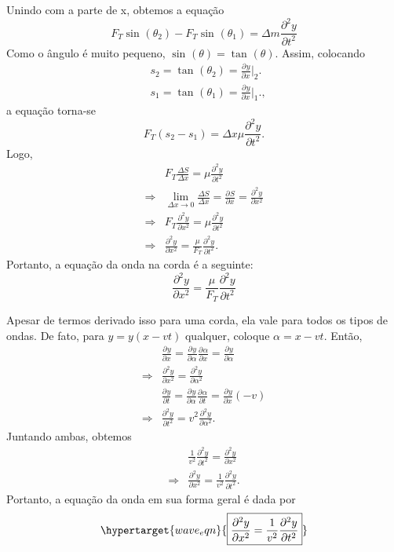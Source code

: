 \documentclass[PhysicsII/physicsII_notes.tex]{subfiles}
\begin{document}
Unindo com a parte de x, obtemos a equação
\[
	F_{T}\sin^{}{(\theta_{2})} - F_{T}\sin^{}{(\theta_{1})} = \Delta m \frac{\partial^{2}{y}}{\partial{t^{2}}}
\]
Como o ângulo é muito pequeno, \(\sin^{}{(\theta )} = \tan^{}{(\theta )}\). Assim, colocando
\begin{align*}
	 & s_{2} = \tan^{}{(\theta_{2})} = \frac{\partial^{}y}{\partial x^{}}\biggl|_{2}^{}\biggr.  \\
	 & s_{1} = \tan^{}{(\theta_{1})} = \frac{\partial^{}y}{\partial x^{}}\biggl|_{1}^{}\biggr.,
\end{align*}
a equação torna-se
\[
	F_{T}(s_{2}-s_{1}) = \Delta x\mu \frac{\partial^{2}y}{\partial t^{2}}.
\]
Logo,
\begin{align*}
	            & F_{T}\frac{\Delta S}{\Delta x} = \mu \frac{\partial^{2}y}{\partial t^{2}}                                              \\
	\Rightarrow & \lim_{\Delta x\to 0}\frac{\Delta S}{\Delta x}= \frac{\partial^{}S}{\partial x^{}}=\frac{\partial^{2}y}{\partial x^{2}} \\
	\Rightarrow & F_{T}\frac{\partial^{2}y}{\partial x^{2}}=\mu \frac{\partial^{2}y}{\partial t^{2}}                                     \\
	\Rightarrow & \frac{\partial^{2}y}{\partial x^{2}}=\frac{\mu}{F_{T}}\frac{\partial^{2}y}{\partial t^{2}}.
\end{align*}
Portanto, a equação da onda na corda é a seguinte:
\[
	\boxed{\frac{\partial^{2}y}{\partial x^{2}}=\frac{\mu}{F_{T}}\frac{\partial^{2}y}{\partial t^{2}}}
\]

Apesar de termos derivado isso para uma corda, ela vale para todos os tipos de ondas. De fato, para
\(y = y(x-vt)\) qualquer, coloque \(\alpha  = x - vt\). Então,
\begin{align*}
	            & \frac{\partial^{}y}{\partial x^{}} = \frac{\partial^{}y}{\partial \alpha ^{}}\frac{\partial^{}\alpha }{\partial x^{}} = \frac{\partial^{}y}{\partial \alpha ^{}} \\
	\Rightarrow & \frac{\partial^{2}y}{\partial x^{2}} = \frac{\partial^{2}y}{\partial \alpha ^{2}}                                                                                \\
	            & \frac{\partial^{}y}{\partial t^{}}=\frac{\partial^{}y}{\partial \alpha ^{}}\frac{\partial^{}\alpha }{\partial t^{}}=\frac{\partial^{}y}{\partial x^{}}(-v)       \\
	\Rightarrow & \frac{\partial^{2}y}{\partial t^{2}}=v^{2}\frac{\partial^{2}y}{\partial \alpha ^{2}}.
\end{align*}
Juntando ambas, obtemos
\begin{align*}
	            & \frac{1}{v^{2}}\frac{\partial^{2}y}{\partial t^{2}}=\frac{\partial^{2}y}{\partial x^{2}}  \\
	\Rightarrow & \frac{\partial^{2}y}{\partial x^{2}}=\frac{1}{v^{2}}\frac{\partial^{2}y}{\partial t^{2}}.
\end{align*}
Portanto, a equação da onda em sua forma geral é dada por
\[
	\hypertarget{wave_eqn}{\boxed{\frac{\partial^{2}y}{\partial x^{2}}=\frac{1}{v^{2}}\frac{\partial^{2}y}{\partial t^{2}}}}
\]
\end{document}
